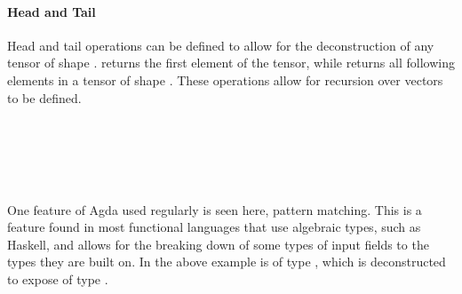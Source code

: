 \paragraph{Head and Tail} Head and tail operations can be defined to 
allow for the deconstruction of any tensor of shape . 
 returns the first element of the tensor, while
 returns all following elements in a tensor of shape .
These operations allow for recursion over vectors to be defined.

\begin{code}%
%
\>[2]\AgdaSpace{}%
\AgdaSymbol{:}\AgdaSpace{}%
\AgdaSpace{}%
\AgdaSymbol{(}\AgdaSpace{}%
\AgdaSymbol{(}\AgdaSpace{}%
\AgdaSymbol{))}\AgdaSpace{}%
\AgdaSpace{}%
\AgdaSpace{}%
\<%
\\
%
\>[2]\AgdaSpace{}%
\AgdaSpace{}%
\AgdaSymbol{=}\AgdaSpace{}%
\AgdaSpace{}%
\AgdaSymbol{(}\AgdaSpace{}%
\AgdaSymbol{)}\<%
\\
%
\\[\AgdaEmptyExtraSkip]%
%
\>[2]\AgdaSpace{}%
\AgdaSymbol{:}\AgdaSpace{}%
\AgdaSpace{}%
\AgdaSymbol{(}\AgdaSpace{}%
\AgdaSymbol{(}\AgdaSpace{}%
\AgdaSymbol{))}\AgdaSpace{}%
\AgdaSpace{}%
\AgdaSpace{}%
\AgdaSpace{}%
\AgdaSymbol{(}\AgdaSpace{}%
\AgdaSymbol{)}\AgdaSpace{}%
\<%
\\
%
\>[2]\AgdaSpace{}%
\AgdaSpace{}%
\AgdaSymbol{(}\AgdaSpace{}%
\AgdaSymbol{)}\AgdaSpace{}%
\AgdaSymbol{=}\AgdaSpace{}%
\AgdaSpace{}%
\AgdaSymbol{(}\AgdaSpace{}%
\AgdaSymbol{(}\AgdaSpace{}%
\AgdaSymbol{))}\<%
\end{code}

One feature of Agda used regularly is seen here, pattern matching.
This is a feature found in most functional languages that use algebraic types,
such as Haskell, and allows for the breaking down of some types of input 
fields to the types they are built on. 
In the above example  is of type , 
which is deconstructed to expose  of type .

